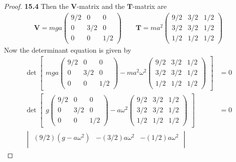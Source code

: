 \documentclass[11pt]{article}
\theoremstyle{definition}
\begin{document}
\begin{proof}{\textbf{15.4}}
    Then the $\bm{V}$-matrix and the $\bm{T}$-matrix are 
    \begin{align*}
        \bm{V} = mga\begin{pmatrix}
            9/2  & 0 & 0\\
            0 & 3/2 & 0\\
            0 & 0 & 1/2
        \end{pmatrix}\quad\quad
        \bm{T} = ma^2\begin{pmatrix}
            9/2  & 3/2 & 1/2\\
            3/2 & 3/2 & 1/2\\
            1/2 & 1/2 & 1/2
        \end{pmatrix}
    \end{align*}
    Now the determinant equation is given by
    \begin{align*}
        \det\begin{bmatrix}
            mga\begin{pmatrix}
                9/2  & 0 & 0\\
                0 & 3/2 & 0\\
                0 & 0 & 1/2
            \end{pmatrix}
            - ma^2\omega^2\begin{pmatrix}
                9/2  & 3/2 & 1/2\\
                3/2 & 3/2 & 1/2\\
                1/2 & 1/2 & 1/2
            \end{pmatrix} 
        \end{bmatrix} &= 0\\
        \det\begin{bmatrix}
            g \begin{pmatrix}
                9/2  & 0 & 0\\
                0 & 3/2 & 0\\
                0 & 0 & 1/2
            \end{pmatrix}
            - a\omega^2\begin{pmatrix}
                9/2  & 3/2 & 1/2\\
                3/2 & 3/2 & 1/2\\
                1/2 & 1/2 & 1/2
            \end{pmatrix}
        \end{bmatrix} &= 0\\
        \begin{vmatrix}
            (9/2)(g - a\omega^2) & - (3/2)a\omega^2 & -(1/2)a\omega^2\\

\end{vmatrix}
\end{align*}
\end{proof}
\end{document}
